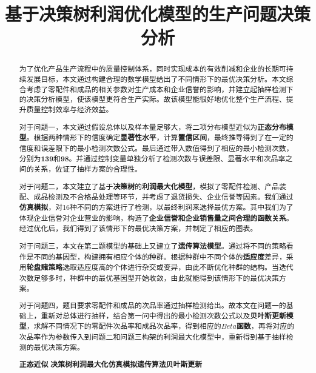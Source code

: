 \documentclass[utf8]{ctexart} %
\title{\textbf{基于决策树利润优化模型的生产问题决策分析}}
\date{}
\renewcommand\normalsize{\fontsize{12pt}{15pt}\selectfont}
\begin{document}
		\maketitle  
		\vspace{-6em}
		\renewcommand{\abstractname}{\Large 摘要}
		\begin{abstract}
			\normalsize
			为了优化产品生产流程中的质量控制体系，同时实现成本的有效削减和企业的长期可持续发展目标，本文通过构建合理的数学模型给出了不同情形下的最优决策分析。本文综合考虑了零配件和成品的相关参数对生产成本和企业信誉的影响，并建立起抽样检测下的决策分析模型，使该模型更符合生产实际。故该模型能很好地优化整个生产流程、提升质量控制效率与经济效益。
			
			对于问题一，本文通过假设总体以及样本量足够大，将二项分布模型近似为\textbf{正态分布模型}。根据两种情形下的信度确定\textbf{显著性水平}，计算\textbf{置信区间}，最终推导得到了在一定的信度和误差限下的最小检测次数公式。最后通过带入数值得到了相应的最小检测次数，分别为\textbf{139}和\textbf{98}。并通过控制变量单独分析了检测次数与误差限、显著水平和次品率之间的关系，佐证了抽样方案的合理性。
			
			对于问题二，本文建立了基于\textbf{决策树}的\textbf{利润最大化模型}，模拟了零配件检测、产品装配、成品检测及不合格品处理等环节，并考虑了退货损失、企业信誉等因素。我们通过\textbf{仿真模拟}，对16种不同的方案进行了检测，以最终利润来选择最优方案。其中我们为了体现企业信誉对企业营业的影响，构造了\textbf{企业信誉和企业销售量之间合理的函数关系}。经过优化后，我们得到了该情形下的最优决策方案，并制定了相应的图表。
			
			对于问题三，本文在第二题模型的基础上又建立了\textbf{遗传算法模型}。通过将不同的策略看作是不同的基因型，构建拥有相应个体的种群。根据种群中不同个体的\textbf{适应度}差异，采用\textbf{轮盘赌策略}选取适应度高的个体进行杂交或变异，由此不断优化种群的结构。当迭代次数足够多时，种群中的最优基因型开始收敛，由此就能得到该情形下的最优决策方案。
			
			对于问题四，题目要求零配件和成品的次品率通过抽样检测给出。故本文在问题一的基础上，重新对总体进行抽样，结合第一问中得出的最小检测次数公式以及\textbf{贝叶斯更新模型}，求解不同情况下的零配件次品率和成品次品率，得到相应的\textbf{$Beta$函数}，再将对应的次品率作为参数传入到问题二和问题三构架的利润最大化模型中，重新得到基于抽样检测的最优决策方案。
			
			\hspace{1em} \textbf{正态近似} \hspace{1em}\textbf{决策树}\hspace{1em}\textbf{利润最大化}\hspace{1em}\textbf{仿真模拟}\hspace{1em}\textbf{遗传算法}\hspace{1em}\textbf{贝叶斯更新} 
		\end{abstract}
		\newpage  
		
\end{document}
